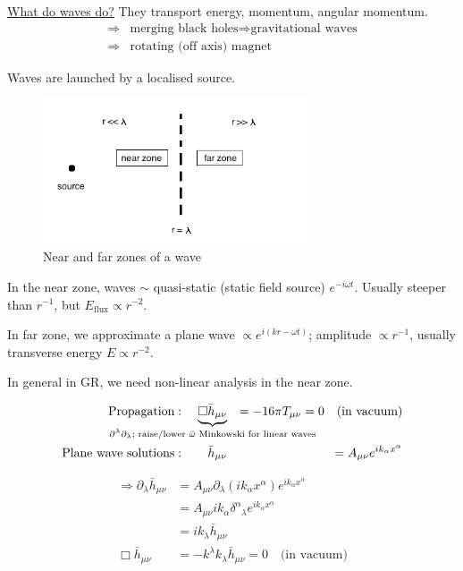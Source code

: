\documentclass[a4paper]{article} %
\newcommand{\ph}[1]{\phantom{#1}}
\begin{document}
\underline{What do waves do?} They transport energy, momentum, angular momentum.
\begin{align}
\Rightarrow&\text{merging black holes}\Rightarrow\text{gravitational waves}\\
\Rightarrow&\text{rotating (off axis) magnet}
\end{align}

Waves are launched by a localised source.

\begin{figure}[h]
\centering
\includegraphics[width=0.7\textwidth]{images/waves-zones.png}
\caption{Near and far zones of a wave}
\end{figure}

In the near zone, waves $\sim$ quasi-static (static field source) $e^{-i\omega t}$. Usually steeper than $r^{-1}$, but $E_{\text{flux}}\propto r^{-2}$.

In far zone, we approximate a plane wave $\propto e^{i(kr-\omega t)}$; amplitude $\propto r^{-1}$, usually transverse energy $E \propto r^{-2}$.

In general in GR, we need non-linear analysis in the near zone.

\begin{align}
\text{Propagation}:&&~\underbrace{\Box\bar{h}_{\mu\nu}}_{\mathclap{\partial^\lambda \partial_{\lambda};\text{ raise/lower $\bar{\omega}$ Minkowski for linear waves}}}
&&=-16\pi T_{\mu\nu} = 0\quad\text{(in vacuum)}\\
\text{Plane wave solutions}:&&~\bar{h}_{\mu\nu}&&=A_{\mu\nu}e^{ik_{\alpha}x^{\alpha}}
\end{align}

\begin{align}
\Rightarrow \partial_{\lambda}\bar{h}_{\mu\nu}&=A_{\mu\nu}\partial_{\lambda}(ik_{\alpha}
x^{\alpha})e^{ik_{\alpha}x^{\alpha}}\\
&=A_{\mu\nu}ik_{\alpha}\delta^{\alpha}_{\ph{\alpha}\lambda}e^{ik_{\alpha}x^{\alpha}}\\
&=ik_{\lambda}\bar{h}_{\mu\nu}\\
\Box \bar{h}_{\mu\nu}&=-k^{\lambda}k_{\lambda}\bar{h}_{\mu\nu}=0\quad\text{(in vacuum)}
\end{align}
\end{document}
